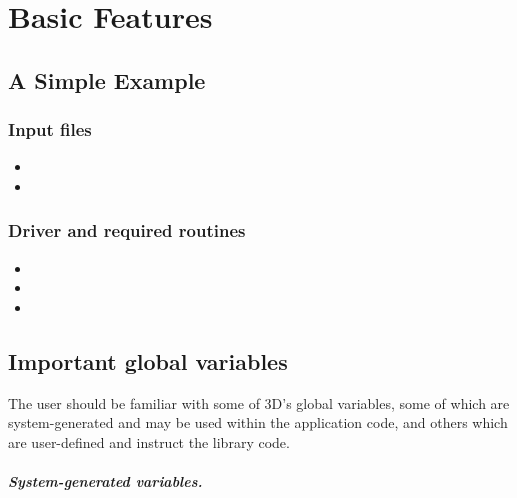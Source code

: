 %
%

\chapter{Basic Features}
\label{chap:basics}


\section{A Simple Example}
\label{sec:simple-example}

\subsection{Input files}

\begin{itemize}
	\item {}
	\item {}
\end{itemize}

\subsection{Driver and required routines}

\begin{itemize}
	\item {}
	\item {}
	\item {}
\end{itemize}

\section{Important global variables}
\label{sec:global-variables}

The user should be familiar with some of \hp3D's global variables, some of which are system-generated and may be used within the application code, and others which are user-defined and instruct the library code.

\paragraph{System-generated variables.}

